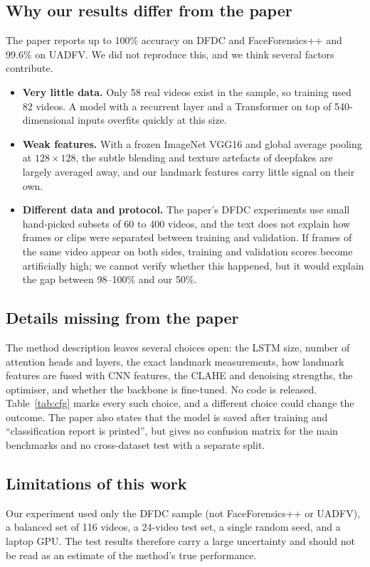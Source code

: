 \documentclass[11pt,a4paper]{article}
\begin{document}
\subsection{Why our results differ from the paper}
The paper reports up to 100\% accuracy on DFDC and FaceForensics++ and 99.6\% on UADFV. We did not reproduce this, and we think several factors contribute.
\begin{itemize}
\item \textbf{Very little data.} Only 58 real videos exist in the sample, so training used 82 videos. A model with a recurrent layer and a Transformer on top of 540-dimensional inputs overfits quickly at this size.
\item \textbf{Weak features.} With a frozen ImageNet VGG16 and global average pooling at $128\times128$, the subtle blending and texture artefacts of deepfakes are largely averaged away, and our landmark features carry little signal on their own.
\item \textbf{Different data and protocol.} The paper's DFDC experiments use small hand-picked subsets of 60 to 400 videos, and the text does not explain how frames or clips were separated between training and validation. If frames of the same video appear on both sides, training and validation scores become artificially high; we cannot verify whether this happened, but it would explain the gap between 98--100\% and our 50\%.
\end{itemize}

\subsection{Details missing from the paper}
The method description leaves several choices open: the LSTM size, number of attention heads and layers, the exact landmark measurements, how landmark features are fused with CNN features, the CLAHE and denoising strengths, the optimiser, and whether the backbone is fine-tuned. No code is released. Table~\ref{tab:cfg} marks every such choice, and a different choice could change the outcome. The paper also states that the model is saved after training and ``classification report is printed'', but gives no confusion matrix for the main benchmarks and no cross-dataset test with a separate split.

\subsection{Limitations of this work}
Our experiment used only the DFDC sample (not FaceForensics++ or UADFV), a balanced set of 116 videos, a 24-video test set, a single random seed, and a laptop GPU. The test results therefore carry a large uncertainty and should not be read as an estimate of the method's true performance.
\end{document}
